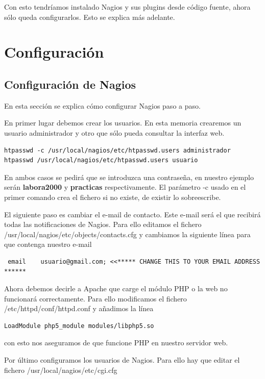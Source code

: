 \documentclass[11pt,a4paper]{article}
\begin{document}
Con esto tendríamos instalado Nagios y sus plugins desde código fuente, ahora sólo queda configurarlos. Esto se explica más adelante.

\section{Configuración}

\subsection{Configuración de Nagios}
En esta sección se explica cómo configurar Nagios paso a paso.

En primer lugar debemos crear los usuarios. En esta memoria crearemos un usuario administrador y otro que sólo pueda consultar la interfaz web.

\begin{verbatim}
htpasswd -c /usr/local/nagios/etc/htpasswd.users administrador
htpasswd /usr/local/nagios/etc/htpasswd.users usuario
\end{verbatim}

En ambos casos se pedirá que se introduzca una contraseña, en nuestro ejemplo serán \textbf{labora2000} y \textbf{practicas} respectivamente. El parámetro -c usado en el primer comando crea el fichero si no existe, de existir lo sobreescribe.

El siguiente paso es cambiar el e-mail de contacto. Este e-mail será el que recibirá todas las notificaciones de Nagios. Para ello editamos el fichero /usr/local/nagios/etc/objects/contacts.cfg y cambiamos la siguiente línea para que contenga nuestro e-mail

\begin{verbatim}
 email    usuario@gmail.com; <<***** CHANGE THIS TO YOUR EMAIL ADDRESS ******
\end{verbatim}

Ahora debemos decirle a Apache que carge el módulo PHP o la web no funcionará correctamente. Para ello modificamos el fichero /etc/httpd/conf/httpd.conf y añadimos la línea

\begin{verbatim}
LoadModule php5_module modules/libphp5.so
\end{verbatim}

con esto nos aseguramos de que funcione PHP en nuestro servidor web.

Por último configuramos los usuarios de Nagios. Para ello hay que editar el fichero /usr/local/nagios/etc/cgi.cfg
\end{document}
